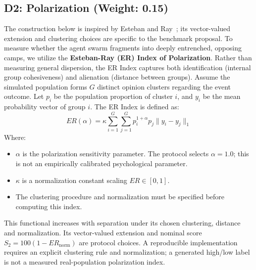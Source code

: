 \subsection{D2: Polarization (Weight: 0.15)}
The construction below is inspired by Esteban and Ray~\cite{esteban1994}; its vector-valued extension and clustering choices are specific to the benchmark proposal.
To measure whether the agent swarm fragments into deeply entrenched, opposing camps, we utilize the \textbf{Esteban-Ray (ER) Index of Polarization}. Rather than measuring general dispersion, the ER Index captures both identification (internal group cohesiveness) and alienation (distance between groups). Assume the simulated population forms $G$ distinct opinion clusters regarding the event outcome. Let $p_i$ be the population proportion of cluster $i$, and $y_i$ be the mean probability vector of group $i$. The ER Index is defined as:
\begin{equation}
    ER(\alpha) = \kappa \sum_{i=1}^G \sum_{j=1}^G p_i^{1+\alpha} p_j \|y_i - y_j\|_1
\end{equation}
Where:
\begin{itemize}
    \item $\alpha$ is the polarization sensitivity parameter. The protocol selects $\alpha=1.0$; this is not an empirically calibrated psychological parameter.
    \item $\kappa$ is a normalization constant scaling $ER \in [0, 1]$.
    \item The clustering procedure and normalization must be specified before computing this index.
\end{itemize}
This functional increases with separation under its chosen clustering, distance and normalization. Its vector-valued extension and nominal score $S_2=100(1-ER_{\mathrm{norm}})$ are protocol choices. A reproducible implementation requires an explicit clustering rule and normalization; a generated high/low label is not a measured real-population polarization index.

